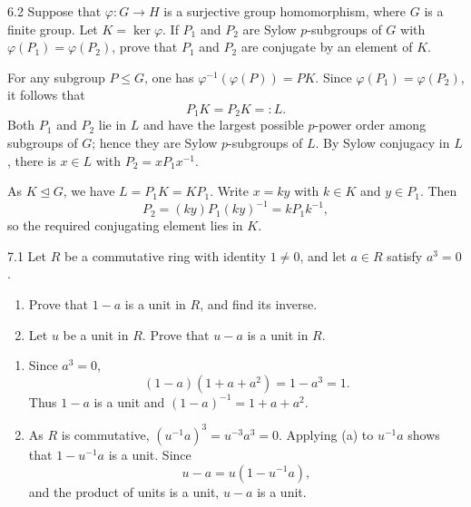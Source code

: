 \documentclass[11pt,oneside]{article}
\begin{document}
\begin{problem}{6.2}
Suppose that $\varphi\colon G\to H$ is a surjective group homomorphism, where $G$ is a finite group. Let $K=\ker\varphi$. If $P_1$ and $P_2$ are Sylow $p$-subgroups of $G$ with $\varphi(P_1)=\varphi(P_2)$, prove that $P_1$ and $P_2$ are conjugate by an element of $K$.
\end{problem}
\begin{solution}
For any subgroup $P\le G$, one has $\varphi^{-1}(\varphi(P))=PK$. Since $\varphi(P_1)=\varphi(P_2)$, it follows that
\[
P_1K=P_2K=:L.
\]
Both $P_1$ and $P_2$ lie in $L$ and have the largest possible $p$-power order among subgroups of $G$; hence they are Sylow $p$-subgroups of $L$. By Sylow conjugacy in $L$, there is $x\in L$ with $P_2=xP_1x^{-1}$.

As $K\trianglelefteq G$, we have $L=P_1K=KP_1$. Write $x=ky$ with $k\in K$ and $y\in P_1$. Then
\[
P_2=(ky)P_1(ky)^{-1}=kP_1k^{-1},
\]
so the required conjugating element lies in $K$.
\end{solution}

\begin{problem}{7.1}
Let $R$ be a commutative ring with identity $1\neq0$, and let $a\in R$ satisfy $a^3=0$.
\begin{enumerate}[label=(\alph*),leftmargin=2.5em,itemsep=0.2em,topsep=0.35em]
\item Prove that $1-a$ is a unit in $R$, and find its inverse.
\item Let $u$ be a unit in $R$. Prove that $u-a$ is a unit in $R$.
\end{enumerate}
\end{problem}
\begin{solution}
\begin{enumerate}[label=(\alph*),leftmargin=2.5em,itemsep=0.55em,topsep=0.2em]
\item Since $a^3=0$,
\[
(1-a)(1+a+a^2)=1-a^3=1.
\]
Thus $1-a$ is a unit and $(1-a)^{-1}=1+a+a^2$.
\item As $R$ is commutative, $(u^{-1}a)^3=u^{-3}a^3=0$. Applying (a) to $u^{-1}a$ shows that $1-u^{-1}a$ is a unit. Since
\[
u-a=u(1-u^{-1}a),
\]
and the product of units is a unit, $u-a$ is a unit.
\end{enumerate}
\end{solution}
\end{document}
